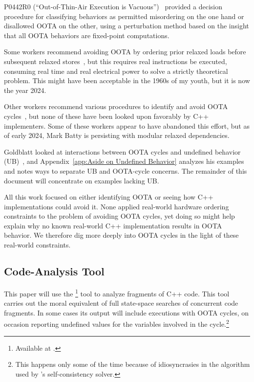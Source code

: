 \documentclass[10]{article}
\begin{document}
P0442R0 (``Out-of-Thin-Air Execution is Vacuous'')~\cite{PaulEMcKenney2016OOTA}
provided a decision procedure for classifying behaviors as permitted
misordering on the one hand or disallowed OOTA on the other, using
a perturbation method based on the insight that all OOTA behaviors are
fixed-point computations.

Some workers recommend avoiding OOTA by ordering prior relaxed
loads before subsequent relaxed
stores~\cite{Boehm:2014:OGA:2618128.2618134,HansBoehm2019OOTArevisitedAgain,Lahav:2017:RSC:3062341.3062352},
but this requires real instructions be executed, consuming real
time and real electrical power to solve a strictly theoretical
problem.
This might have been acceptable in the 1960s of my youth, but it is now
the year 2024.

Other workers recommend various procedures to identify and avoid OOTA
cycles~\cite{Lahav:2017:RSC:3062341.3062352,Sinclair:2017:CAR:3079856.3080206,Lee:10.1145/3385412.3386010,MarkBatty2019ModularRelaxedDependenciesOOTA},
but none of these have been looked upon favorably by C++ implementers.
Some of these workers appear to have abandoned this effort, but as of
early 2024, Mark Batty is persisting with modular relaxed dependencies.

Goldblatt looked at interactions between OOTA cycles and
undefined behavior (UB)~\cite{DavidGoldblatt2019NoElegantOOTAfix}, and
Appendix~\ref{app:Aside on Undefined Behavior}
analyzes his examples and notes ways to separate UB and OOTA-cycle
concerns.
The remainder of this document will concentrate on examples lacking UB.

All this work focused on either identifying OOTA or seeing how C++
implementations could avoid it.
None applied real-world hardware ordering constraints to the problem
of avoiding OOTA cycles,
yet doing so might help explain why no known real-world C++ implementation
results in OOTA behavior.
We therefore dig more deeply into OOTA cycles in the light
of these real-world constraints.

\subsection{Code-Analysis Tool}
\label{sec:Code-Analysis Tool}

This paper will use the \footnote{
	Available at .}
tool to analyze fragments of C++ code.
This tool carries out the moral equivalent of full state-space searches
of concurrent code fragments.
In some cases its output will include executions with OOTA cycles,
on occasion reporting undefined values for the variables involved in
the cycle.\footnote{
	This happens only some of the time because of idiosyncrasies
	in the algorithm used by 's self-consistency solver.}
\end{document}
